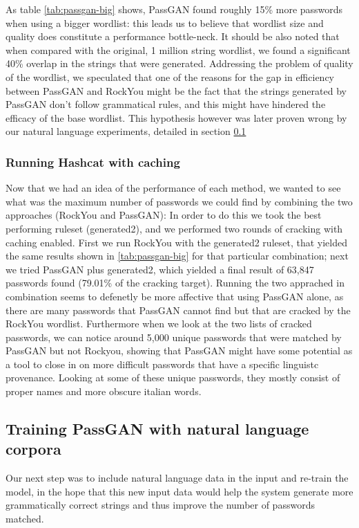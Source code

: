 As table \ref{tab:passgan-big} shows, PassGAN found roughly 15\% more passwords when using a bigger wordlist: this leads us to believe that wordlist size and quality does constitute a performance bottle-neck. It should be also noted that when compared with the original, 1 million string wordlist, we found a significant 40\% overlap in the strings that were generated. Addressing the problem of quality of the wordlist, we speculated that one of the reasons for the gap in efficiency between PassGAN and RockYou might be the fact that the strings generated by PassGAN don't follow grammatical rules, and this might have hindered the efficacy of the base wordlist. This hypothesis however was later proven wrong by our natural language experiments, detailed in section \ref{subsec:nl-testing}

\subsubsection{Running Hashcat with caching}\label{subsubsec:potfile-enable}
Now that we had an idea of the performance of each method, we wanted to see what was the maximum number of passwords we could find by combining the two approaches (RockYou and PassGAN):
In order to do this we took the best performing ruleset (generated2), and we performed two rounds of cracking with caching enabled. First we run RockYou with the generated2 ruleset, that yielded the same results shown in \ref{tab:passgan-big} for that particular combination; next we tried PassGAN plus generated2, which yielded a final result of 63,847 passwords found (79.01\% of the cracking target). Running the two apprached in combination seems to defenetly be more affective that using PassGAN alone, as there are many passwords that PassGAN cannot find but that are cracked by the RockYou wordlist.
Furthermore when we look at the two lists of cracked passwords, we can notice around 5,000 unique passwords that were matched by PassGAN but not Rockyou, showing that PassGAN might have some potential as a tool to close in on more difficult passwords that have a specific linguistc provenance. Looking at some of these unique passwords, they mostly consist of proper names and more obscure italian words.

\subsection{Training PassGAN with natural language corpora} \label{subsec:nl-testing}
Our next step was to include natural language data in the input and re-train the model, in the hope that this new input data would help the system generate more grammatically correct strings and thus improve the number of passwords matched.

